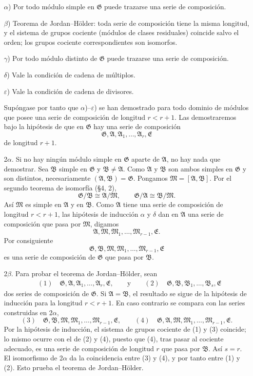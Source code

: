 \documentclass[11pt]{article}
\providecommand{\mM}{\mathfrak{M}}
\providecommand{\mA}{\mathfrak{A}}
\providecommand{\mB}{\mathfrak{B}}
\providecommand{\mE}{\mathfrak{E}}
\providecommand{\mG}{\mathfrak{G}}
\begin{document}
$\alpha$) Por todo módulo simple en $\mG$ puede trazarse una serie de composición.

$\beta$) Teorema de Jordan--Hölder: toda serie de composición tiene la misma longitud, y el sistema de grupos cociente (módulos de clases residuales) coincide salvo el orden; los grupos cociente correspondientes son isomorfos.

$\gamma$) Por todo módulo distinto de $\mG$ puede trazarse una serie de composición.

$\delta$) Vale la condición de cadena de múltiplos.

$\varepsilon$) Vale la condición de cadena de divisores.

Supóngase por tanto que $\alpha$)--$\varepsilon$) se han demostrado para todo dominio de módulos que posee una serie de composición de longitud $r<r+1$. Las demostraremos bajo la hipótesis de que en $\mG$ hay una serie de composición
\[
        \mG,\mA,\mA_1,\ldots,\mA_r,\mE
\]
de longitud $r+1$.

2$\alpha$. Si no hay ningún módulo simple en $\mG$ aparte de $\mA$, no hay nada que demostrar. Sea $\mB$ simple en $\mG$ y $\mB\ne\mA$. Como $\mA$ y $\mB$ son ambos simples en $\mG$ y son distintos, necesariamente $(\mA,\mB)=\mG$. Pongamos $\mM=[\mA,\mB]$. Por el segundo teorema de isomorfía (§4, 2),
\[
        \mG/\mB\cong \mA/\mM,
        \qquad
        \mG/\mA\cong \mB/\mM.
\]
Así $\mM$ es simple en $\mA$ y en $\mB$. Como $\mA$ tiene una serie de composición de longitud $r<r+1$, las hipótesis de inducción $\alpha$ y $\delta$ dan en $\mA$ una serie de composición que pasa por $\mM$, digamos
\[
        \mA,\mM,\mM_1,\ldots,\mM_{r-1},\mE.
\]
Por consiguiente
\[
        \mG,\mB,\mM,\mM_1,\ldots,\mM_{r-1},\mE
\]
es una serie de composición de $\mG$ que pasa por $\mB$.

2$\beta$. Para probar el teorema de Jordan--Hölder, sean
\[
\begin{aligned}
&(1)\quad \mG,\mA,\mA_1,\ldots,\mA_r,\mE,\qquad\text{y}\qquad
(2)\quad \mG,\mB,\mB_1,\ldots,\mB_s,\mE
\end{aligned}
\]
dos series de composición de $\mG$. Si $\mA=\mB$, el resultado se sigue de la hipótesis de inducción para la longitud $r<r+1$. En caso contrario se compara con las series construidas en 2$\alpha$,
\[
        (3)\quad \mG,\mB,\mM,\mM_1,\ldots,\mM_{r-1},\mE,
        \qquad
        (4)\quad \mG,\mA,\mM,\mM_1,\ldots,\mM_{r-1},\mE.
\]
Por la hipótesis de inducción, el sistema de grupos cociente de (1) y (3) coincide; lo mismo ocurre con el de (2) y (4), puesto que (4), tras pasar al cociente adecuado, es una serie de composición de longitud $r$ que pasa por $\mB$. Así $s=r$. El isomorfismo de 2$\alpha$ da la coincidencia entre (3) y (4), y por tanto entre (1) y (2). Esto prueba el teorema de Jordan--Hölder.
\end{document}
